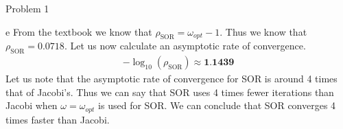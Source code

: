 \begin{section}{Problem 1}
    \newpage 

    \begin{solution}{e}
        From the textbook we know that $\rho_\text{SOR} = \omega_{opt} - 1$. Thus we know that $\rho_\text{SOR} = 0.0718$. Let us now calculate an asymptotic rate of convergence.
        \begin{align*}
            - \log_{10} \left( \rho_\text{SOR} \right) \approx \textbf{1.1439}
        \end{align*}
        Let us note that the asymptotic rate of convergence for SOR is around 4 times that of Jacobi's. Thus we can say that SOR uses 4 times fewer iterations than Jacobi when $\omega = \omega_{opt}$ is used for SOR. We can conclude that SOR converges 4 times faster than Jacobi.
    \end{solution}

\end{section}